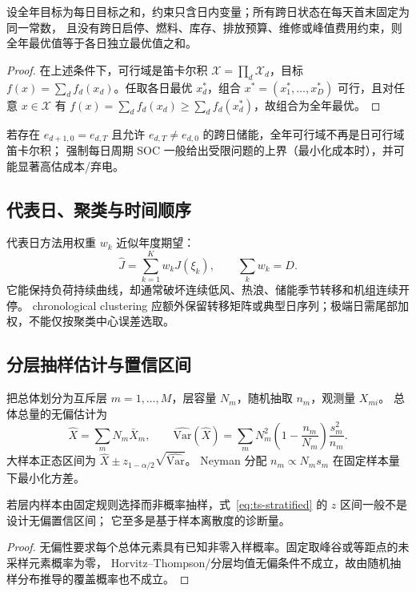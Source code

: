 \begin{theorem}[独立日分解的等价条件]\label{thm:ts-day-separable}
设全年目标为每日目标之和，约束只含日内变量；所有跨日状态在每天首末固定为同一常数，
且没有跨日启停、燃料、库存、排放预算、维修或峰值费用约束，则全年最优值等于各日独立最优值之和。
\end{theorem}
\begin{proof}
在上述条件下，可行域是笛卡尔积 $\mathcal X=\prod_d\mathcal X_d$，目标
$f(x)=\sum_df_d(x_d)$。任取各日最优 $x_d^*$，组合 $x^*=(x_1^*,\ldots,x_D^*)$ 可行，且对任意
$x\in\mathcal X$ 有 $f(x)=\sum_df_d(x_d)\ge\sum_df_d(x_d^*)$，故组合为全年最优。
\end{proof}

\begin{corollary}[季节储能下不等价]
若存在 $e_{d+1,0}=e_{d,T}$ 且允许 $e_{d,T}\ne e_{d,0}$ 的跨日储能，全年可行域不再是日可行域笛卡尔积；
强制每日周期 SOC 一般给出受限问题的上界（最小化成本时），并可能显著高估成本/弃电。
\end{corollary}

\subsection{代表日、聚类与时间顺序}
代表日方法用权重 $w_k$ 近似年度期望：
\begin{equation}
\widehat J=\sum_{k=1}^Kw_kJ(\xi_k),\qquad \sum_kw_k=D.\label{eq:ts-repday}
\end{equation}
它能保持负荷持续曲线，却通常破坏连续低风、热浪、储能季节转移和机组连续开停。
chronological clustering 应额外保留转移矩阵或典型日序列；极端日需尾部加权，不能仅按聚类中心误差选取。

\subsection{分层抽样估计与置信区间}
把总体划分为互斥层 $m=1,\ldots,M$，层容量 $N_m$，随机抽取 $n_m$，观测量 $X_{mi}$。
总体总量的无偏估计为
\begin{equation}
\widehat X=\sum_mN_m\bar X_m,\qquad
\widehat{\mathrm{Var}}(\widehat X)=\sum_mN_m^2\left(1-\frac{n_m}{N_m}\right)\frac{s_m^2}{n_m}.\label{eq:ts-stratified}
\end{equation}
大样本正态区间为 $\widehat X\pm z_{1-\alpha/2}\sqrt{\widehat{\mathrm{Var}}}$。
Neyman 分配 $n_m\propto N_ms_m$ 在固定样本量下最小化方差。

\begin{proposition}[确定性取点不产生统计置信度]\label{prop:ts-deterministic-sample}
若层内样本由固定规则选择而非概率抽样，式~\eqref{eq:ts-stratified} 的 $z$ 区间一般不是设计无偏置信区间；
它至多是基于样本离散度的诊断量。
\end{proposition}
\begin{proof}
无偏性要求每个总体元素具有已知非零入样概率。固定取峰谷或等距点的未采样元素概率为零，
Horvitz--Thompson/分层均值无偏条件不成立，故由随机抽样分布推导的覆盖概率也不成立。
\end{proof}

